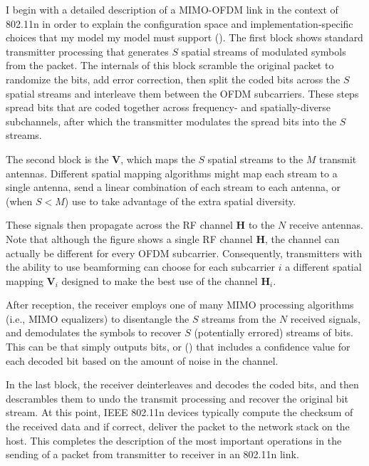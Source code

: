 I begin with a detailed description of a MIMO-OFDM link in the context of 802.11n in order to explain the configuration space and implementation-specific choices that my model my model must support (). The first block shows standard transmitter processing that generates $S$ spatial streams of modulated symbols from the packet. The internals of this block scramble the original packet to randomize the bits, add error correction, then split the coded bits across the $S$ spatial streams and interleave them between the OFDM subcarriers. These steps spread bits that are coded together across frequency- and spatially-diverse subchannels, after which the transmitter modulates the spread bits into the $S$ streams.

The second block is the  $\mathbf{V}$, which maps the $S$ spatial streams to the $M$ transmit antennas. Different spatial mapping algorithms might map each stream to a single antenna, send a linear combination of each stream to each antenna, or (when $S<M$) use  to take advantage of the extra spatial diversity.

These signals then propagate across the RF channel $\mathbf{H}$ to the $N$ receive antennas. Note that although the figure shows a single RF channel $\mathbf{H}$, the channel can actually be different for every OFDM subcarrier. Consequently, transmitters with the ability to use beamforming can choose for each subcarrier $i$ a different spatial mapping $\mathbf{V}_i$ designed to make the best use of the channel $\mathbf{H}_i$.

After reception, the receiver employs one of many MIMO processing algorithms (i.e., MIMO equalizers) to disentangle the $S$ streams from the $N$ received signals, and demodulates the symbols to recover $S$ (potentially errored) streams of bits. This can be  that simply outputs bits, or  (\cite[\S5.3.1.3]{Sklar,Jamieson_PPR}) that includes a confidence value for each decoded bit based on the amount of noise in the channel.

In the last block, the receiver deinterleaves and decodes the coded bits, and then descrambles them to undo the transmit processing and recover the original bit stream. At this point, IEEE 802.11n devices typically compute the checksum of the received data and if correct, deliver the packet to the network stack on the host. This completes the description of the most important operations in the sending of a packet from transmitter to receiver in an 802.11n link.

